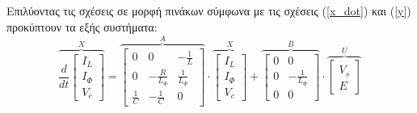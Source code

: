\noindent
Επιλύοντας τις σχέσεις σε μορφή πινάκων σύμφωνα με τις σχέσεις (\ref{x_dot}) και (\ref{y}) προκύπτουν τα εξής συστήματα:
\begin{equation*}
	\overbrace{
		\frac{d}{dt} 
		\begin{bmatrix}
			I_L\\
			I_{\Phi}\\
			V_c
		\end{bmatrix}
	}^{\dot{X}}
	=
	\overbrace{
		\begin{bmatrix}
			0 		& 					0 			 & -\frac{1}{L}\\
			0       & -\frac{R}{L_{\Phi}} & \frac{1}{L_{\Phi}}\\
			\frac{1}{C}  & 		   -\frac{1}{C}      & 				0
		\end{bmatrix}
	}^A
	\cdot
	\overbrace{
		\begin{bmatrix}
			I_L\\
			I_{\Phi}\\
			V_c
		\end{bmatrix}
	}^X
	+ 	
	\overbrace{
		\begin{bmatrix}
			0  			&	    			0 			\\
			0           &  -\frac{1}{L_{\Phi}}\\
			0		    & 		  			0
		\end{bmatrix}
	}^B
	\cdot
	\overbrace{
		\begin{bmatrix}
			V_s\\
			E		
		\end{bmatrix}
	}^U
\end{equation*} 

